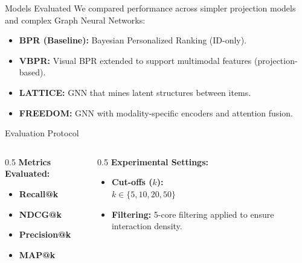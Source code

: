 \documentclass[aspectratio=169]{beamer}
\begin{document}
\begin{frame}{Models Evaluated}
  We compared performance across simpler projection models and complex Graph Neural Networks:
  \vspace{1em}
  \begin{itemize}
    \item \textbf{BPR (Baseline):} Bayesian Personalized Ranking (ID-only).
    \item \textbf{VBPR:} Visual BPR extended to support multimodal features (projection-based).
    \item \textbf{LATTICE:} GNN that mines latent structures between items.
    \item \textbf{FREEDOM:} GNN with modality-specific encoders and attention fusion.
  \end{itemize}
\end{frame}


\begin{frame}{Evaluation Protocol}
  \begin{columns}
      \begin{column}{0.5\textwidth}
          \textbf{Metrics Evaluated:}
          \begin{itemize}
              \item \textbf{Recall@k}
              \item \textbf{NDCG@k}
              \item \textbf{Precision@k}
              \item \textbf{MAP@k}
          \end{itemize}
      \end{column}
      \begin{column}{0.5\textwidth}
          \textbf{Experimental Settings:}
          \begin{itemize}
              \item \textbf{Cut-offs ($k$):} \\ $k \in \{5, 10, 20, 50\}$
              \item \textbf{Filtering:} 5-core filtering applied to ensure interaction density.
          \end{itemize}
      \end{column}
  \end{columns}
\end{frame}

\end{document}
